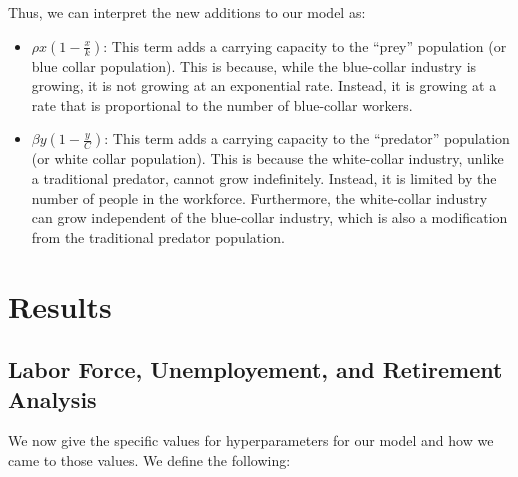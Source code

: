\documentclass[11pt]{amsart}
\begin{document}
Thus, we can interpret the new additions to our model as:

\begin{itemize}
    \item $\rho x (1-\frac{x}{k})$: This term adds a carrying capacity to the ``prey'' population (or blue collar population). This is because, while the blue-collar industry is growing, it is not growing at an exponential rate. Instead, it is growing at a rate that is proportional to the number of blue-collar workers.
    \item $\beta y (1-\frac{y}{C})$: This term adds a carrying capacity to the ``predator'' population (or white collar population). This is because the white-collar industry, unlike a traditional predator, cannot grow indefinitely. Instead, it is limited by the number of people in the workforce. Furthermore, the white-collar industry can grow independent of the blue-collar industry, which is also a modification from the traditional predator population.
\end{itemize}


\section{Results}

\subsection{Labor Force, Unemployement, and Retirement Analysis}

We now give the specific values for hyperparameters for our model and how we came to those values. We define the following:
\end{document}
